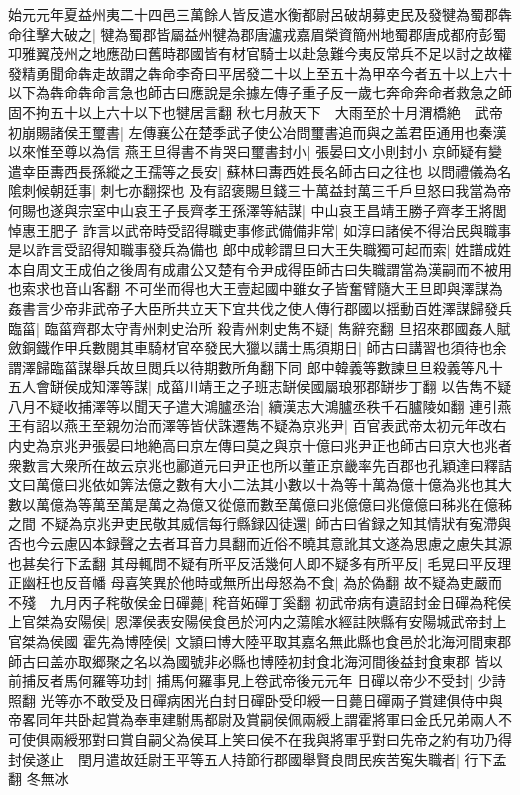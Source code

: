 始元元年夏益州夷二十四邑三萬餘人皆反遣水衡都尉呂破胡募吏民及發犍為蜀郡犇命往擊大破之|{
	犍為蜀郡皆屬益州犍為郡唐瀘戎嘉眉榮資簡州地蜀郡唐成都府彭蜀卭雅翼茂州之地應劭曰舊時郡國皆有材官騎士以赴急難今夷反常兵不足以討之故權發精勇聞命犇走故謂之犇命李奇曰平居發二十以上至五十為甲卒今者五十以上六十以下為犇命犇命言急也師古曰應說是余據左傳子重子反一歲七奔命奔命者救急之師固不拘五十以上六十以下也犍居言翻}
秋七月赦天下　大雨至於十月渭橋絶　武帝初崩賜諸侯王璽書|{
	左傳襄公在楚季武子使公冶問璽書追而與之盖君臣通用也秦漢以來惟至尊以為信}
燕王旦得書不肯哭曰璽書封小|{
	張晏曰文小則封小}
京師疑有變遣幸臣夀西長孫縱之王孺等之長安|{
	蘇林曰夀西姓長名師古曰之往也}
以問禮儀為名隂刺候朝廷事|{
	刺七亦翻探也}
及有詔褒賜旦錢三十萬益封萬三千戶旦怒曰我當為帝何賜也遂與宗室中山哀王子長齊孝王孫澤等結謀|{
	中山哀王昌靖王勝子齊孝王將閭悼惠王肥子}
詐言以武帝時受詔得職吏事修武備備非常|{
	如淳曰諸侯不得治民與職事是以詐言受詔得知職事發兵為備也}
郎中成軫謂旦曰大王失職獨可起而索|{
	姓譜成姓本自周文王成伯之後周有成肅公又楚有令尹成得臣師古曰失職謂當為漢嗣而不被用也索求也音山客翻}
不可坐而得也大王壹起國中雖女子皆奮臂隨大王旦即與澤謀為姦書言少帝非武帝子大臣所共立天下宜共伐之使人傳行郡國以揺動百姓澤謀歸發兵臨菑|{
	臨菑齊郡太守青州刺史治所}
殺青州刺史雋不疑|{
	雋辭兖翻}
旦招來郡國姦人賦斂銅鐵作甲兵數閱其車騎材官卒發民大獵以講士馬須期日|{
	師古曰講習也須待也余謂澤歸臨菑謀舉兵故旦閲兵以待期數所角翻下同}
郎中韓義等數諫旦旦殺義等凡十五人會缾侯成知澤等謀|{
	成菑川靖王之子班志缾侯國屬琅邪郡缾步丁翻}
以告雋不疑八月不疑收捕澤等以聞天子遣大鴻臚丞治|{
	續漢志大鴻臚丞秩千石臚陵如翻}
連引燕王有詔以燕王至親勿治而澤等皆伏誅遷雋不疑為京兆尹|{
	百官表武帝太初元年改右内史為京兆尹張晏曰地絶高曰京左傳曰莫之與京十億曰兆尹正也師古曰京大也兆者衆數言大衆所在故云京兆也酈道元曰尹正也所以董正京畿率先百郡也孔穎達曰釋詰文曰萬億曰兆依如筭法億之數有大小二法其小數以十為等十萬為億十億為兆也其大數以萬億為等萬至萬是萬之為億又從億而數至萬億曰兆億億曰兆億億曰秭兆在億秭之間}
不疑為京兆尹吏民敬其威信每行縣録囚徒還|{
	師古曰省録之知其情狀有寃滯與否也今云慮囚本録聲之去者耳音力具翻而近俗不曉其意訛其文遂為思慮之慮失其源也甚矣行下孟翻}
其母輒問不疑有所平反活幾何人即不疑多有所平反|{
	毛晃曰平反理正幽枉也反音幡}
母喜笑異於他時或無所出母怒為不食|{
	為於偽翻}
故不疑為吏嚴而不殘　九月丙子秺敬侯金日磾薨|{
	秺音妬磾丁奚翻}
初武帝病有遺詔封金日磾為秺侯上官桀為安陽侯|{
	恩澤侯表安陽侯食邑於河内之蕩隂水經註陜縣有安陽城武帝封上官桀為侯國}
霍先為博陸侯|{
	文頴曰博大陸平取其嘉名無此縣也食邑於北海河間東郡師古曰盖亦取郷聚之名以為國號非必縣也博陸初封食北海河間後益封食東郡}
皆以前捕反者馬何羅等功封|{
	捕馬何羅事見上卷武帝後元元年}
日磾以帝少不受封|{
	少詩照翻}
光等亦不敢受及日磾病困光白封日磾卧受印綬一日薨日磾兩子賞建俱侍中與帝畧同年共卧起賞為奉車建駙馬都尉及賞嗣侯佩兩綬上謂霍將軍曰金氏兄弟兩人不可使俱兩綬邪對曰賞自嗣父為侯耳上笑曰侯不在我與將軍乎對曰先帝之約有功乃得封侯遂止　閏月遣故廷尉王平等五人持節行郡國舉賢良問民疾苦寃失職者|{
	行下孟翻}
冬無冰


